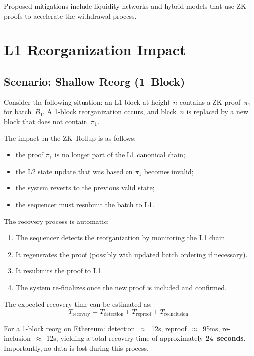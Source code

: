 \documentclass[
]{elteikthesis}[2024/04/26]
\begin{document}
Proposed mitigations include liquidity networks and hybrid models that use ZK proofs to accelerate the withdrawal process.

\section{L1 Reorganization Impact}

\subsection{Scenario: Shallow Reorg (1~Block)}

Consider the following situation: an L1 block at height~$n$ contains a ZK proof~$\pi_1$ for batch~$B_1$. A 1-block reorganization occurs, and block~$n$ is replaced by a new block that does not contain~$\pi_1$.

The impact on the ZK~Rollup is as follows:
\begin{itemize}
    \item the proof $\pi_1$ is no longer part of the L1 canonical chain;
    \item the L2 state update that was based on $\pi_1$ becomes invalid;
    \item the system reverts to the previous valid state;
    \item the sequencer must resubmit the batch to L1.
\end{itemize}

The recovery process is automatic:
\begin{enumerate}
    \item The sequencer detects the reorganization by monitoring the L1 chain.
    \item It regenerates the proof (possibly with updated batch ordering if necessary).
    \item It resubmits the proof to L1.
    \item The system re-finalizes once the new proof is included and confirmed.
\end{enumerate}

The expected recovery time can be estimated as:
\begin{equation}
T_{\text{recovery}} = T_{\text{detection}} + T_{\text{reproof}} + T_{\text{re-inclusion}}
\end{equation}

For a 1-block reorg on Ethereum: detection~$\approx$~12s, reproof~$\approx$~95ms, re-inclusion~$\approx$~12s, yielding a total recovery time of approximately \textbf{24~seconds}. Importantly, no data is lost during this process.
\end{document}
